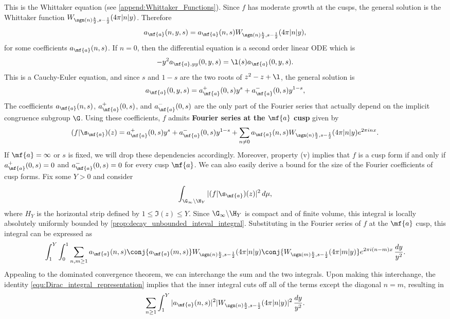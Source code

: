     This is the Whittaker equation (see \cref{append:Whittaker_Functions}). Since $f$ has moderate growth at the cusps, the general solution is the Whittaker function $W_{\sgn(n)\frac{k}{2},s-\frac{1}{2}}(4\pi|n|y)$. Therefore
    \[
      a_{\mf{a}}(n,y,s) = a_{\mf{a}}(n,s)W_{\sgn(n)\frac{k}{2},s-\frac{1}{2}}(4\pi|n|y),
    \]
    for some coefficients $a_{\mf{a}}(n,s)$. If $n = 0$, then the differential equation is a second order linear ODE which is
    \[
      -y^{2}a_{\mf{a},yy}(0,y,s) = \l(s)a_{\mf{a}}(0,y,s).
    \]
    This is a Cauchy-Euler equation, and since $s$ and $1-s$ are the two roots of $z^{2}-z+\l$, the general solution is
    \[
      a_{\mf{a}}(0,y,s) = a_{\mf{a}}^{+}(0,s)y^{s}+a_{\mf{a}}^{-}(0,s)y^{1-s},
    \]
    The coefficients $a_{\mf{a}}(n,s)$, $a_{\mf{a}}^{+}(0,s)$, and $a_{\mf{a}}^{-}(0,s)$ are the only part of the Fourier series that actually depend on the implicit congruence subgroup $\G$. Using these coefficients, $f$ admits \textbf{Fourier series at the $\mf{a}$ cusp} given by
    \[
      (f|\s_{\mf{a}})(z) = a_{\mf{a}}^{+}(0,s)y^{s}+a_{\mf{a}}^{-}(0,s)y^{1-s}+\sum_{n \neq 0}a_{\mf{a}}(n,s)W_{\sgn(n)\frac{k}{2},s-\frac{1}{2}}(4\pi|n|y)e^{2\pi inx}.
    \]
    If $\mf{a} = \infty$ or $s$ is fixed, we will drop these dependencies accordingly. Moreover, property (v) implies that $f$ is a cusp form if and only if $a_{\mf{a}}^{+}(0,s) = 0$ and $a_{\mf{a}}^{-}(0,s) = 0$ for every cusp $\mf{a}$. We can also easily derive a bound for the size of the Fourier coefficients of cusp forms. Fix some $Y > 0$ and consider
    \[
      \int_{\G_{\infty}\backslash\H_{Y}}|(f|\s_{\mf{a}})(z)|^{2}\,d\mu,
    \]
    where $H_{Y}$ is the horizontal strip defined by $1 \le \Im(z) \le Y$. Since $\G_{\infty}\backslash\H_{Y}$ is compact and of finite volume, this integral is locally absolutely uniformly bounded by \cref{prop:decay_unbounded_inteval_integral}. Substituting in the Fourier series of $f$ at the $\mf{a}$ cusp, this integral can be expressed as
    \[
      \int_{1}^{Y}\int_{0}^{1}\sum_{n,m \ge 1}a_{\mf{a}}(n,s)\conj{a_{\mf{a}}(m,s)}W_{\sgn(n)\frac{k}{2},s-\frac{1}{2}}(4\pi|n|y)\conj{W_{\sgn(m)\frac{k}{2},s-\frac{1}{2}}(4\pi|m|y)}e^{2\pi i(n-m)x}\,\frac{dy}{y^{2}}.
    \]
    Appealing to the dominated convergence theorem, we can interchange the sum and the two integrals. Upon making this interchange, the identity \cref{equ:Dirac_integral_representation} implies that the inner integral cuts off all of the terms except the diagonal $n = m$, resulting in
    \[
      \sum_{n \ge 1}\int_{1}^{Y}|a_{\mf{a}}(n,s)|^{2}|W_{\sgn(n)\frac{k}{2},s-\frac{1}{2}}(4\pi|n|y)|^{2}\,\frac{dy}{y^{2}}.
    \]
